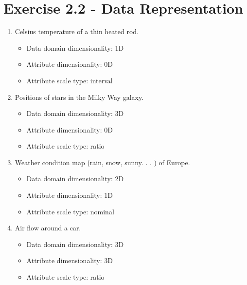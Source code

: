 \documentclass[a4paper]{article}
\begin{document}
	\section*{Exercise 2.2 - Data Representation}
	\begin{enumerate}
		\item Celsius temperature of a thin heated rod.
		\begin{itemize}
			\item Data domain dimensionality: 1D %
			\item Attribute dimensionality: 0D %
			\item Attribute scale type: interval %
		\end{itemize}
		\item Positions of stars in the Milky Way galaxy.
		\begin{itemize}
			\item Data domain dimensionality: 3D %
			\item Attribute dimensionality: 0D
			\item Attribute scale type: ratio %
		\end{itemize}
		\item Weather condition map (rain, snow, sunny. . . ) of Europe.
		\begin{itemize}
			\item Data domain dimensionality: 2D %
			\item Attribute dimensionality: 1D %
			\item Attribute scale type: nominal %
		\end{itemize}
		\item Air flow around a car. %
		\begin{itemize}
			\item Data domain dimensionality: 3D 
			\item Attribute dimensionality: 3D  %
			\item Attribute scale type: ratio %
		\end{itemize}

\end{enumerate}
\end{document}
